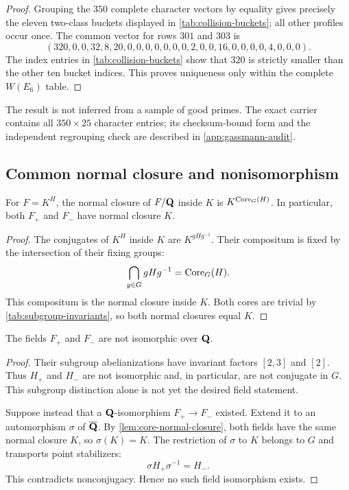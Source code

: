 \begin{proof}
Grouping the $350$ complete character vectors by equality gives precisely
the eleven two-class buckets displayed in \cref{tab:collision-buckets}; all
other profiles occur once.  The common vector for rows $301$ and $303$ is
\[
(320,0,0,32,8,20,0,0,0,0,0,0,0,2,0,0,16,0,0,0,0,4,0,0,0).
\]
The index entries in \cref{tab:collision-buckets} show that $320$ is strictly
smaller than the other ten bucket indices.  This proves uniqueness only
within the complete $W(E_6)$ table.
\end{proof}

The result is not inferred from a sample of good primes.  The exact carrier
contains all $350\times25$ character entries; its checksum-bound form and
the independent regrouping check are described in \cref{app:gassmann-audit}.

\subsection{Common normal closure and nonisomorphism}

\begin{lemma}
\label{lem:core-normal-closure}
For $F=K^H$, the normal closure of $F/\mathbf{Q}$ inside $K$ is
$K^{\operatorname{Core}_G(H)}$.  In particular, both $F_+$ and $F_-$ have normal closure
$K$.
\end{lemma}

\begin{proof}
The conjugates of $K^H$ inside $K$ are $K^{gHg^{-1}}$.  Their compositum is
fixed by the intersection of their fixing groups:
\[
 \bigcap_{g\in G}gHg^{-1}=\operatorname{Core}_G(H).
\]
This compositum is the normal closure inside $K$.  Both cores are trivial by
\cref{tab:subgroup-invariants}, so both normal closures equal $K$.
\end{proof}

\begin{lemma}
\label{lem:field-nonisomorphism}
The fields $F_+$ and $F_-$ are not isomorphic over $\mathbf{Q}$.
\end{lemma}

\begin{proof}
Their subgroup abelianizations have invariant factors $[2,3]$ and $[2]$.
Thus $H_+$ and $H_-$ are not isomorphic and, in particular, are not
conjugate in $G$.  This subgroup distinction alone is not yet the desired
field statement.

Suppose instead that a $\mathbf{Q}$-isomorphism $F_+\to F_-$ existed.  Extend it to
an automorphism $\sigma$ of $\overline{\mathbf{Q}}$.  By
\cref{lem:core-normal-closure}, both fields have the same normal closure
$K$, so $\sigma(K)=K$.  The restriction of $\sigma$ to $K$ belongs to $G$
and transports point stabilizers:
\[
 \sigma H_+\sigma^{-1}=H_-.
\]
This contradicts nonconjugacy.  Hence no such field isomorphism exists.
\end{proof}

